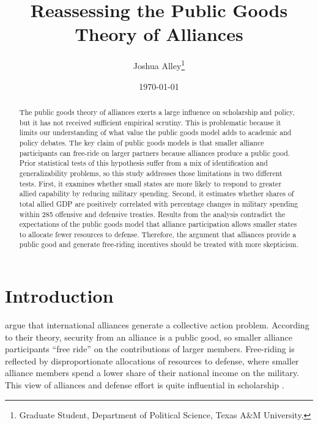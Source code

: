 \documentclass[12pt]{article}
\title{
\textbf{Reassessing the Public Goods Theory of Alliances}
	}
\author{Joshua Alley\footnote{Graduate Student,
Department of Political Science, Texas A\&M University.}}
\date{{\normalsize \today}}
\begin{document}
\maketitle 

\doublespace

\begin{abstract}
The public goods theory of alliances exerts a large influence on scholarship and policy, but it has not received sufficient empirical scrutiny. 
This is problematic because it limits our understanding of what value the public goods model adds to academic and policy debates. 
The key claim of public goods models is that smaller alliance participants can free-ride on larger partners because alliances produce a public good. 
Prior statistical tests of this hypothesis suffer from a mix of identification and generalizability problems, so this study addresses those limitations in two different tests. 
First, it examines whether small states are more likely to respond to greater allied capability by reducing military spending. 
Second, it estimates whether shares of total allied GDP are positively correlated with percentage changes in military spending within 285 offensive and defensive treaties. 
Results from the analysis contradict the expectations of the public goods model that alliance participation allows smaller states to allocate fewer resources to defense. 
Therefore, the argument that alliances provide a public good and generate free-riding incentives should be treated with more skepticism. 

\end{abstract} 

\newpage


\section{Introduction}



\citet{OlsonZeckhauser1966} argue that international alliances generate a collective action problem. 
According to their theory, security from an alliance is a public good, so smaller alliance participants ``free ride'' on the contributions of larger members. 
Free-riding is reflected by disproportionate allocations of resources to defense, where smaller alliance members spend a lower share of their national income on the military.
This view of alliances and defense effort is quite influential in scholarship \citep{Walt1990, Mearsheimer1994, Goldstein1995, SandlerHartley2001, Garfinkel2004, Walt2009, Norrlof2010, Barrett2010, PluemperNeumayer2015}. 
\end{document}
